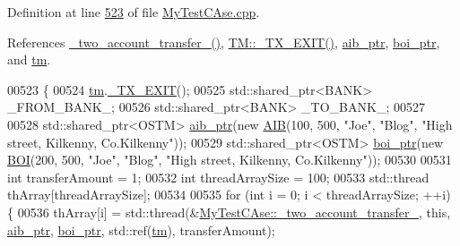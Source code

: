 Definition at line \hyperlink{_my_test_c_ase_8cpp_source_l00523}{523} of file \hyperlink{_my_test_c_ase_8cpp_source}{My\+Test\+C\+Ase.\+cpp}.



References \hyperlink{_my_test_c_ase_8cpp_source_l00266}{\+\_\+two\+\_\+account\+\_\+transfer\+\_\+()}, \hyperlink{_t_m_8cpp_source_l00102}{T\+M\+::\+\_\+\+T\+X\+\_\+\+E\+X\+I\+T()}, \hyperlink{_my_test_c_ase_8h_source_l00066}{aib\+\_\+ptr}, \hyperlink{_my_test_c_ase_8h_source_l00067}{boi\+\_\+ptr}, and \hyperlink{_my_test_c_ase_8h_source_l00065}{tm}.


\begin{DoxyCode}
00523                                                        \{
00524     \hyperlink{class_my_test_c_ase_a422e6e5d4ddedea384be96031c89b72b_a422e6e5d4ddedea384be96031c89b72b}{tm}.\hyperlink{class_t_m_a5e2d1127f2429f2f524d25f430eade06_a5e2d1127f2429f2f524d25f430eade06}{\_TX\_EXIT}();
00525     std::shared\_ptr<BANK> \_FROM\_BANK\_;
00526     std::shared\_ptr<BANK> \_TO\_BANK\_;
00527     
00528     std::shared\_ptr<OSTM> \hyperlink{class_my_test_c_ase_adad50e8278b64aa0321000b528e5362c_adad50e8278b64aa0321000b528e5362c}{aib\_ptr}(\textcolor{keyword}{new} \hyperlink{class_a_i_b}{AIB}(100, 500, \textcolor{stringliteral}{"Joe"}, \textcolor{stringliteral}{"Blog"}, \textcolor{stringliteral}{"High street, Kilkenny,
       Co.Kilkenny"}));
00529     std::shared\_ptr<OSTM> \hyperlink{class_my_test_c_ase_a5554de9e3e6393a89c66c036c529720b_a5554de9e3e6393a89c66c036c529720b}{boi\_ptr}(\textcolor{keyword}{new} \hyperlink{class_b_o_i}{BOI}(200, 500, \textcolor{stringliteral}{"Joe"}, \textcolor{stringliteral}{"Blog"}, \textcolor{stringliteral}{"High street, Kilkenny,
       Co.Kilkenny"}));
00530     
00531     \textcolor{keywordtype}{int} transferAmount = 1;
00532     \textcolor{keywordtype}{int} threadArraySize = 100; 
00533     std::thread thArray[threadArraySize];
00534 
00535     \textcolor{keywordflow}{for} (\textcolor{keywordtype}{int} i = 0; i < threadArraySize; ++i) \{
00536         thArray[i] = std::thread(&\hyperlink{class_my_test_c_ase_af0cc86421d281cc4a583a394ae86dbdd_af0cc86421d281cc4a583a394ae86dbdd}{MyTestCAse::\_two\_account\_transfer\_}, \textcolor{keyword}{
      this}, \hyperlink{class_my_test_c_ase_adad50e8278b64aa0321000b528e5362c_adad50e8278b64aa0321000b528e5362c}{aib\_ptr}, \hyperlink{class_my_test_c_ase_a5554de9e3e6393a89c66c036c529720b_a5554de9e3e6393a89c66c036c529720b}{boi\_ptr}, std::ref(\hyperlink{class_my_test_c_ase_a422e6e5d4ddedea384be96031c89b72b_a422e6e5d4ddedea384be96031c89b72b}{tm}), transferAmount);

\end{DoxyCode}
